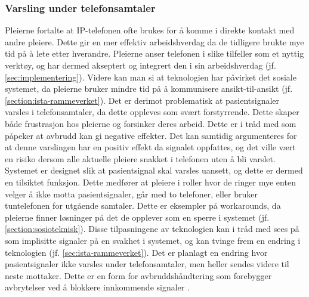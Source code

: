 \subsubsection{Varsling under telefonsamtaler}
Pleierne fortalte at IP-telefonen ofte brukes for å komme i direkte kontakt med andre pleiere. Dette gir en mer effektiv arbeidshverdag da de tidligere brukte mye tid på å lete etter hverandre. Pleierne anser telefonen i slike tilfeller som et nyttig verktøy, og har dermed akseptert og integrert den i sin arbeidshverdag (jf. \ref{sec:implementering}). Videre kan man si at teknologien har påvirket det sosiale systemet, da pleierne bruker mindre tid på å kommunisere ansikt-til-ansikt (jf. \ref{section:ista-rammeverket}). Det er derimot problematisk at pasientsignaler varsles i telefonsamtaler, da dette oppleves som svært forstyrrende. Dette skaper både frustrasjon hos pleierne og forsinker deres arbeid. Dette er i tråd med \citet{Grundgeiger09} som påpeker at avbrudd kan gi negative effekter. Det kan samtidig argumenteres for at denne varslingen har en positiv effekt da signalet oppfattes, og det ville vært en risiko dersom alle aktuelle pleiere snakket i telefonen uten å bli varslet. Systemet er designet slik at pasientsignal skal varsles uansett, og dette er dermed en tilsiktet funksjon. Dette medfører at pleiere i roller hvor de ringer mye enten velger å ikke motta pasientsignaler, går med to telefoner, eller bruker tuntelefonen for utgående samtaler. Dette er eksempler på workarounds, da pleierne finner løsninger på det de opplever som en sperre i systemet (jf. \ref{section:sosioteknisk}). Disse tilpasningene av teknologien kan i tråd med \citet{Coiera07} sees på som implisitte signaler på en svakhet i systemet, og kan tvinge frem en endring i teknologien (jf. \ref{sec:ista-rammeverket}). Det er planlagt en endring hvor pasientsignaler ikke varsles under telefonsamtaler, men heller sendes videre til neste mottaker. Dette er en form for avbruddshåndtering som forebygger avbrytelser ved å blokkere innkommende signaler \citep{Grandhi10}.
	
